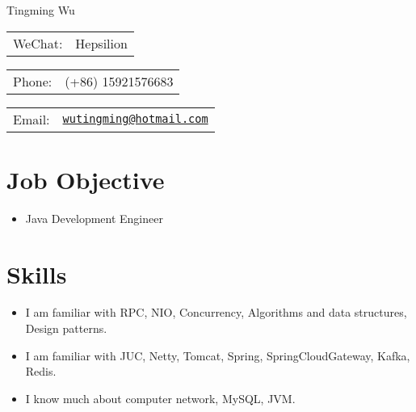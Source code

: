 \documentclass[letterpaper, UTF8]{article}
\def\name{Tingming Wu}
\begin{document}
	
	{\huge \name}
	
	
	\vspace{0.15in}  %
	
	\begin{minipage}{0.33\linewidth}
		\begin{tabular}{ll}
			WeChat: & Hepsilion \\
		\end{tabular}
	\end{minipage}
	\begin{minipage}{0.33\linewidth}
		\begin{tabular}{ll}
			Phone: & (+86) 15921576683 \\
		\end{tabular}
	\end{minipage}
	\begin{minipage}{0.33\linewidth}
		\begin{tabular}{ll}
			Email: & \href{mailto:wutingming@hotmail.com}{\tt wutingming@hotmail.com} \\
		\end{tabular}
	\end{minipage}
	\vspace{-0.1in}
	
	\section*{\textbf{Job Objective}}\vspace{-0.05in}
	\begin{itemize}
		\item Java Development Engineer
	\end{itemize}
	\vspace{-0.25in}
	
	\section*{\textbf{Skills}}\vspace{-0.05in}
	\begin{itemize}
		\item I am familiar with RPC, NIO, Concurrency, Algorithms and data structures, Design patterns.
		\item I am familiar with JUC, Netty, Tomcat, Spring, SpringCloudGateway, Kafka, Redis.
		\item I know much about computer network, MySQL, JVM.
	\end{itemize}
	\vspace{-0.32in}
	
\end{document}
